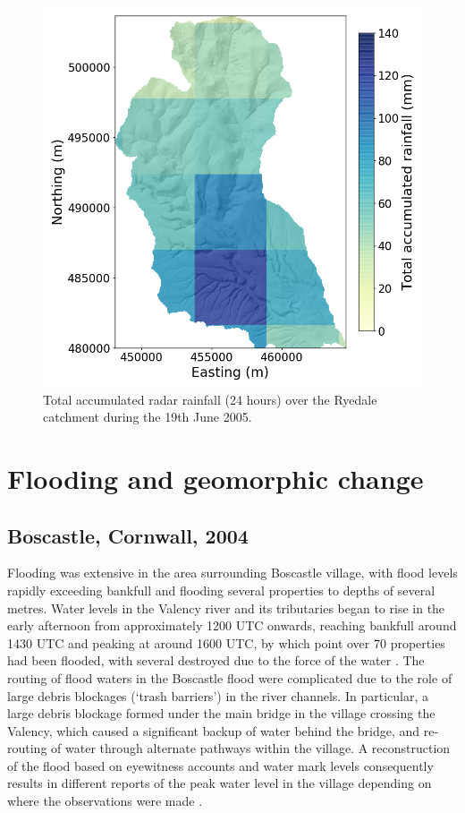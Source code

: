 \begin{figure}[htb]
\includegraphics[width=13cm]{chp_events_figures_scripts/figure_ryedale_total_rainfall.png}
\caption{Total accumulated radar rainfall (24 hours) over the Ryedale catchment during the 19th June 2005.}
\label{fig_ryedale_rain_totals}
\end{figure}

\section{Flooding and geomorphic change}

\subsection{Boscastle, Cornwall, 2004}
Flooding was extensive in the area surrounding Boscastle village, with flood levels rapidly exceeding bankfull and flooding several properties to depths of several metres. Water levels in the Valency river and its tributaries began to rise in the early afternoon from approximately 1200 UTC onwards, reaching bankfull around 1430 UTC and peaking at around 1600 UTC, by which point over 70 properties had been flooded, with several destroyed due to the force of the water \citep{wallingford2005flooding}.
The routing of flood waters in the Boscastle flood were complicated due to the role of large debris blockages (`trash barriers') in the river channels. In particular, a large debris blockage formed under the main bridge in the village crossing the Valency, which caused a significant backup of water behind the bridge, and re-routing of water through alternate pathways within the village. A reconstruction of the flood based on eyewitness accounts and water mark levels consequently results in different reports of the peak water level in the village depending on where the observations were made \citep{wallingford2005flooding}. 

